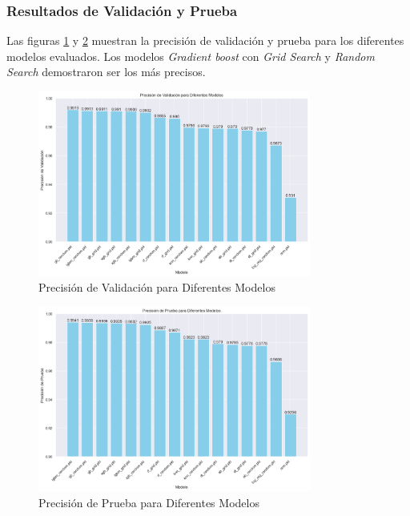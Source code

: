 \subsubsection*{Resultados de Validación y Prueba}

Las figuras \ref{fig:precision_validacion} y \ref{fig:precision_prueba} muestran la precisión de validación y prueba para los diferentes modelos evaluados. Los modelos \textit{Gradient boost} con \textit{Grid Search} y \textit{Random Search} demostraron ser los más precisos.

\begin{figure}[H]
    \centering
    \includegraphics[width=0.8\textwidth]{precisionValidacion.png}
    \caption{Precisión de Validación para Diferentes Modelos}
    \label{fig:precision_validacion}
\end{figure}

\begin{figure}[H]
    \centering
    \includegraphics[width=0.8\textwidth]{precisionPrueba.png}
    \caption{Precisión de Prueba para Diferentes Modelos}
    \label{fig:precision_prueba}
\end{figure}

